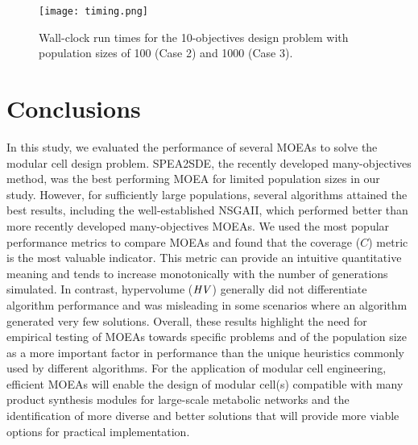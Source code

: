 {\begin{figure}[!t]
    \centering
    \texttt{[image: timing.png]}
    \caption[Wall-clock run times]{Wall-clock run times for the 10-objectives design problem with population sizes of 100 (Case 2) and 1000 (Case 3).}
\label{fig4:timing}
\end{figure}


\section{Conclusions}
In this study, we evaluated the performance of several MOEAs to solve the modular cell design problem. SPEA2SDE, the recently developed many-objectives method, was the best performing MOEA for limited population sizes in our study. However, for sufficiently large populations, several algorithms attained the best results, including the well-established NSGAII, which performed better than more recently developed many-objectives MOEAs. We used the most popular performance metrics to compare MOEAs and found that the coverage ($C$) metric is the most valuable indicator. This metric can provide an intuitive quantitative meaning and tends to increase monotonically with the number of generations simulated. In contrast, hypervolume ($\mathit{HV}$) generally did not differentiate algorithm performance and was misleading in some scenarios where an algorithm generated very few solutions. Overall, these results highlight the need for empirical testing of MOEAs towards specific problems and of the population size as a more important factor in performance than the unique heuristics commonly used by different algorithms.
For the application of modular cell engineering, efficient MOEAs will enable the design of modular cell(s) compatible with many product synthesis modules for large-scale metabolic networks and the identification of more diverse and better solutions that will provide more viable options for practical implementation.








}
